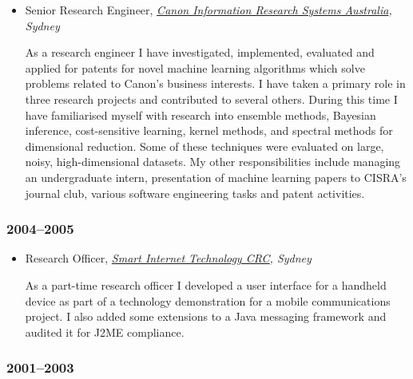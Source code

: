 \documentclass{article}
\begin{document}
\begin{itemize}%
\item Senior Research Engineer, \emph{\href{http://www.cisra.com.au/}{Canon Information Research Systems Australia}, Sydney}

As a research engineer I have investigated, implemented, evaluated and applied for patents for novel machine learning algorithms which solve problems related to Canon'{}s business interests. I have taken a primary role in three research projects and contributed to several others. During this time I have familiarised myself with research into ensemble methods, Bayesian inference, cost-sensitive learning, kernel methods, and spectral methods for dimensional reduction. Some of these techniques were evaluated on large, noisy, high-dimensional datasets. My other responsibilities include managing an undergraduate intern, presentation of machine learning papers to CISRA'{}s journal club, various software engineering tasks and patent activities.



\end{itemize}
\hypertarget{20042005}{}\subsubsection*{{2004--{}2005}}\label{20042005}

\begin{itemize}%
\item Research Officer, \emph{\href{http://www.smartservicescrc.com.au/AboutUs.html}{Smart Internet Technology CRC}, Sydney}

As a part-time research officer I developed a user interface for a handheld device as part of a technology demonstration for a mobile communications project. I also added some extensions to a Java messaging framework and audited it for J2ME compliance.



\end{itemize}
\hypertarget{20012003}{}\subsubsection*{{2001--{}2003}}\label{20012003}
\end{document}
